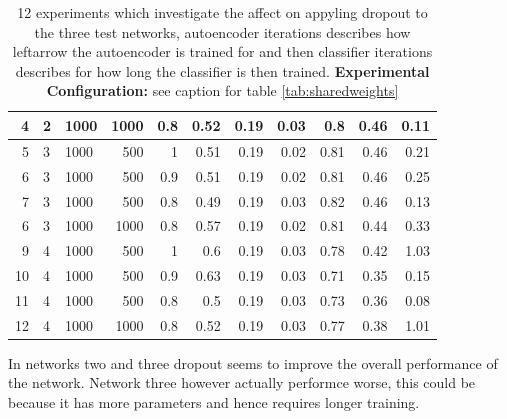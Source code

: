 \begin{table}[h]
\begin{tabular}{rllrrrrrrrr}
      4                    & 2       & 1000             & 1000       & 0.8      & 0.52     & 0.19      & 0.03      & 0.8                  & 0.46                 & 0.11                 \\
      \hline
      5                    & 3       & 1000             & 500       & 1        & 0.51     & 0.19      & 0.02      & 0.81                 & 0.46                 & 0.21                 \\
      6                    & 3       & 1000             & 500       & 0.9      & 0.51     & 0.19      & 0.02      & 0.81                 & 0.46                 & 0.25                 \\
      7                    & 3       & 1000             & 500       & 0.8      & 0.49     & 0.19      & 0.03      & 0.82                 & 0.46                 & 0.13                 \\
      6                    & 3       & 1000             & 1000       & 0.8      & 0.57     & 0.19      & 0.02      & 0.81                 & 0.44                 & 0.33                 \\
      \hline
      9                    & 4       & 1000             & 500       & 1        & 0.6      & 0.19      & 0.03      & 0.78                 & 0.42                 & 1.03                 \\
      10                   & 4       & 1000             & 500       & 0.9      & 0.63     & 0.19      & 0.03      & 0.71                 & 0.35                 & 0.15                 \\
      11                   & 4       & 1000             & 500       & 0.8      & 0.5      & 0.19      & 0.03      & 0.73                 & 0.36                 & 0.08\\
      12                   & 4       & 1000             & 1000       & 0.8      & 0.52      & 0.19      & 0.03      & 0.77   & 0.38     & 1.01\\
      \hline
      \end{tabular}
      \caption{12 experiments which investigate the affect on appyling dropout to the three test networks, autoencoder iterations describes how leftarrow
      the autoencoder is trained for and then classifier iterations describes for how long the classifier is then trained. {\bf Experimental Configuration:} see caption for table \ref{tab:sharedweights}}
      \label{tab:dropout}
      \end{table}

      In networks two and three dropout seems to improve the overall performance of the network. Network three however
      actually performce worse, this could be because it has more parameters and hence requires longer training.


